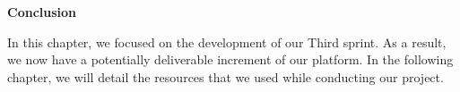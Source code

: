 \begin{center}
    \doublespacing 
    \centering
    \LARGE\textbf{Conclusion} 
    \vspace{1cm} \\
    \raggedright
\end{center}
In this chapter, we focused on the development of our Third sprint. As a result, we now have a potentially deliverable increment of our platform.
In the following chapter, we will detail the resources that we used while conducting our project.



